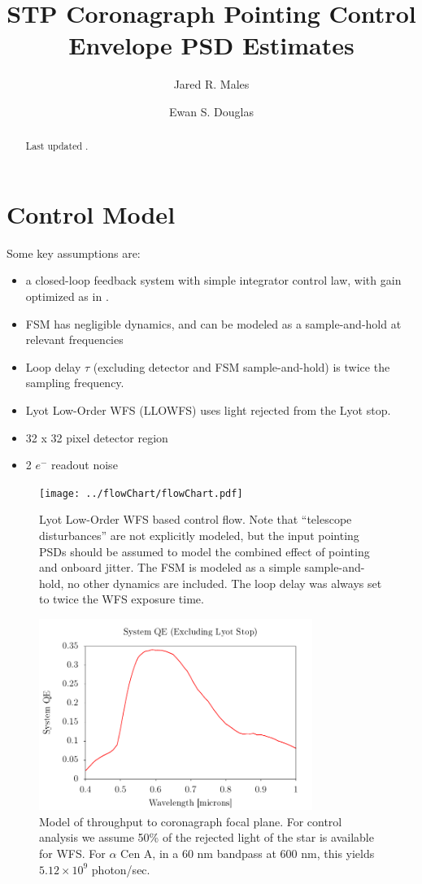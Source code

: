 \documentclass[10pt,preprint]{aastex631}
\begin{document}
\title{STP Coronagraph Pointing Control Envelope PSD Estimates}

\author{Jared R. Males}
\author{Ewan S. Douglas}

\begin{abstract}
Last updated \DTMnow.
\end{abstract}

\section{Control Model}

Some key assumptions are:
\begin{itemize}
\item a closed-loop feedback system with simple integrator control law, with gain optimized as in \citet{2018JATIS...4a9001M}. 
\item FSM has negligible dynamics, and can be modeled as a sample-and-hold at relevant frequencies
\item Loop delay $\tau$ (excluding detector and FSM sample-and-hold) is twice the sampling frequency.
\item Lyot Low-Order WFS (LLOWFS) uses light rejected from the Lyot stop.
\item 32 x 32 pixel detector region
\item 2 $e^-$ readout noise
\end{itemize}

\begin{figure}
\centering
\texttt{[image: ../flowChart/flowChart.pdf]}
\vspace{-3cm}
\caption{Lyot Low-Order WFS based control flow.  Note that ``telescope disturbances'' are not explicitly modeled, but the input pointing PSDs should be assumed to model the combined effect of pointing and onboard jitter.  The FSM is modeled as a simple sample-and-hold, no other dynamics are included.  The loop delay was always set to twice the WFS exposure time.  \label{fig:flowChart}}
\end{figure}

\begin{figure}
\centering
\includegraphics[width=3.5in]{effective_QE.pdf}
\caption{Model of throughput to coronagraph focal plane. For control analysis we assume 50\% of the rejected light of the star is available for WFS.  For $\alpha$ Cen A, in a 60 nm bandpass at 600 nm, this yields $5.12\times10^{9}$ photon/sec. \label{fig:QE}}
\end{figure}
\afterpage{\clearpage}
\end{document}
